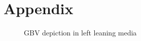 \documentclass{article}
\begin{document}
\section{Appendix}{

\begin{figure}[H]
	\caption{\label{fig:my-label1} GBV depiction in left leaning media}
\end{figure}


}
\end{document}
